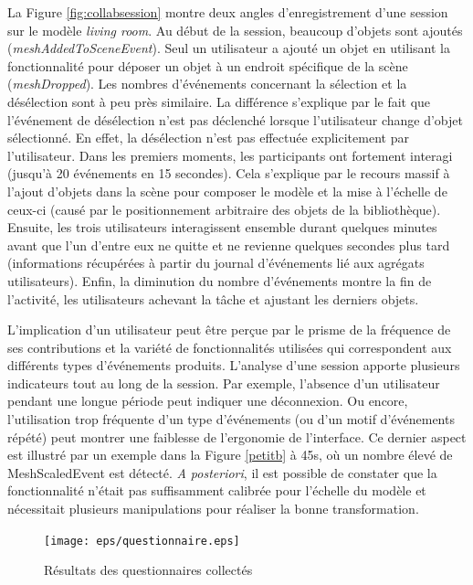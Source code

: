 La Figure \ref{fig:collabsession} montre deux angles d'enregistrement d'une session 
sur le modèle \textit{living room}. Au début de la session, beaucoup d'objets sont 
ajoutés (\textit{meshAddedToSceneEvent}). Seul un utilisateur a ajouté un objet 
en utilisant la fonctionnalité pour déposer un objet à un endroit spécifique de la 
scène (\textit{meshDropped}). Les nombres d'événements concernant la sélection 
et 
la désélection sont à peu près similaire. La différence s'explique par 
le fait que l'événement de désélection n'est pas déclenché lorsque l'utilisateur 
change d'objet sélectionné. En effet, la désélection n'est pas effectuée 
explicitement par l'utilisateur. 
Dans les premiers moments, les participants ont fortement interagi 
(jusqu'à 20 événements en 15 secondes). Cela s'explique par le recours massif à 
l'ajout d'objets dans la scène pour composer le modèle et la mise à l'échelle de 
ceux-ci (causé par le positionnement arbitraire des objets de la bibliothèque). 
Ensuite, les trois utilisateurs interagissent ensemble durant quelques
minutes avant que l'un d'entre 
eux ne quitte et ne revienne quelques secondes plus tard (informations 
récupérées à partir du journal d'événements lié aux agrégats utilisateurs). Enfin, la diminution du nombre d'événements montre la fin de l'activité, les utilisateurs achevant 
la tâche et ajustant les derniers objets.

L'implication d'un utilisateur peut être perçue par le prisme de la fréquence de ses 
contributions et la variété de fonctionnalités utilisées qui correspondent aux 
différents 
types d'événements produits. L'analyse d'une session apporte plusieurs indicateurs 
tout au long de la session. Par exemple, l'absence d'un utilisateur pendant une 
longue période peut indiquer une déconnexion. Ou encore, l'utilisation trop 
fréquente d'un type d'événements (ou d'un motif d'événements répété) peut montrer 
une faiblesse de l'ergonomie de l'interface. Ce dernier aspect est illustré par un exemple dans la Figure \ref{petitb} à 45s, où un nombre élevé de 
MeshScaledEvent est détecté. \textit{A posteriori}, il est possible de constater  
que la fonctionnalité n'était pas suffisamment calibrée pour l'échelle du modèle et 
nécessitait plusieurs manipulations pour réaliser la bonne transformation.

	\begin{figure}[]
		\centering
		\texttt{[image: eps/questionnaire.eps]} 
		\caption{Résultats des questionnaires collectés}
		\label{fig:questionnaire}
	\end{figure}


